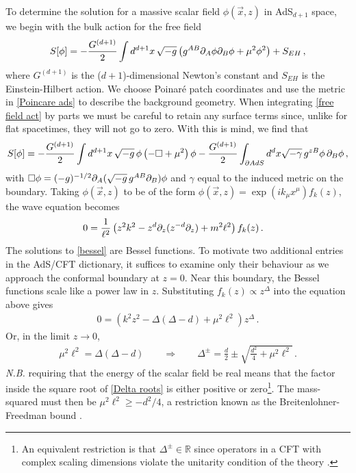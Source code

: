 \documentclass[../PhD.tex]{subfiles}
\begin{document}
To determine the solution for a massive scalar field $\phi(\vec x, z)$ in AdS$_{d+1}$ space, we begin with the bulk action for the free field
\begin{align}
\label{free field act}
S[\phi] = -\frac{G^{(d+1)}}{2} \int d^{d+1} x \, \sqrt{-g} \left( g^{AB} \partial_A \phi \partial_B \phi + \mu^2 \phi^2 \right) + S_{EH} \, ,
\end{align}
where $G^{(d+1)}$ is the ($d+1$)-dimensional Newton's constant and $S_{EH}$ is the Einstein-Hilbert action. We choose Poinar\'e patch coordinates and use the metric in \eqref{Poincare ads} to describe the background geometry. When integrating \eqref{free field act} by parts we must be careful to retain any surface terms since, unlike for flat spacetimes, they will not go to zero. With this is mind, we find that
\begin{align}
\label{action int by parts}
S[\phi] = -\frac{G^{(d+1)}}{2} \int d^{d+1}x \, \sqrt{-g}\, \phi \left( - \Box + \mu^2 \right) \phi - \frac{G^{(d+1)}}{2}\int_{\partial AdS} d^d x \sqrt{-\gamma} \, g^{zB} \phi \, \partial_B \phi \, ,
\end{align}
with $\Box \phi = (-g)^{-1/2} \partial_A (\sqrt{-g} \, g^{AB} \partial_B) \phi$ and $\gamma$ equal to the induced metric on the boundary. Taking $\phi(\vec x, z)$ to be of the form $\phi(\vec x, z) = \exp( i k_\mu x^\mu) f_k (z)$, the wave equation becomes
\begin{align}
\label{bessel}
0 &= \frac{1}{\ell^2} \left( z^2 k^2 - z^{d} \partial_z (z^{-d} \partial_z ) + m^2 \ell^2 \right) f_k(z) \, .
\end{align}
The solutions to \eqref{bessel} are Bessel functions. To motivate two additional entries in the AdS/CFT dictionary, it suffices to examine only their behaviour as we approach the conformal boundary at $z = 0$. Near this boundary, the Bessel functions scale like a power law in $z$. Substituting $f_k(z) \propto z^{\Delta}$ into the equation above gives
\begin{align}
0 = \left(k^2 z^2 - \Delta(\Delta - d) + \mu^2 \ell^2 \right) z^\Delta \, .
\end{align}
Or, in the limit $z \to 0$,
\begin{align}
\label{Delta roots}
\mu^2 \ell^2 = \Delta (\Delta - d) \qquad \Rightarrow \qquad \Delta^{\pm} = \frac{d}{2} \pm \sqrt{\frac{d^2}{4} + \mu^2\ell^2} \, .
\end{align}
{\it N.B.} requiring that the energy of the scalar field be real means that the factor inside the square root of \eqref{Delta roots} is either positive or zero\footnote{An equivalent restriction is that $\Delta^{\pm} \in \mathbb{R}$ since operators in a CFT with complex scaling dimensions violate the unitarity condition of the theory \cite{1805.04405}.}. The mass-squared must then be $\mu^2 \ell^2 \geq - d^2 /4$, a restriction known as the Breitenlohner-Freedman bound \cite{Breitenlohner:1982bm}. 
\end{document}
